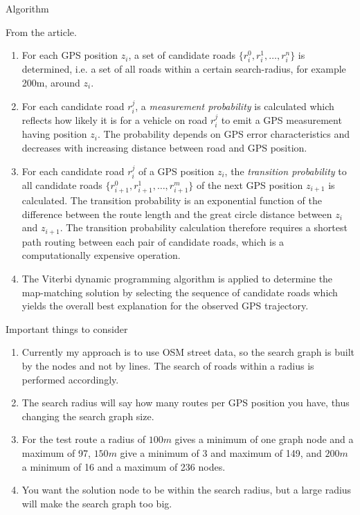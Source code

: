 \documentclass[10pt,letterpaper]{article}
\begin{document}
\begin{section}{Algorithm}

From the article.

\begin{enumerate}
	\item For each GPS position $z_i$, a set of candidate roads $\{r_i^0, r_i^1, \dots, r_i^n\}$ is determined, i.e. a set of all roads within a certain search-radius, for example 200m, around $z_i$.

	\item For each candidate road $r_i^j$, a \emph{measurement probability} is calculated which reflects how likely it is for a vehicle on road $r_i^j$ to emit a GPS measurement having position $z_i$. The probability depends on GPS error characteristics and decreases with increasing distance between road and GPS position.

	\item For each candidate road $r_i^j$ of a GPS position $z_i$, the \emph{transition probability} to all candidate roads $\{r_{i+1}^0, r_{i+1}^1, \dots, r_{i+1}^m\}$ of the next GPS position $z_{i+1}$ is calculated. The transition probability is an exponential function of the difference between the route length and the great circle distance between $z_i$ and $z_{i+1}$. The transition probability calculation therefore requires a shortest path routing between each pair of candidate roads, which is a computationally expensive operation.

	\item The Viterbi dynamic programming algorithm is applied to determine the map-matching solution by selecting the sequence of candidate roads which yields the overall best explanation for the observed GPS trajectory.
\end{enumerate}

\end{section}

\begin{section}{Important things to consider}
\begin{enumerate}
	\item Currently my approach is to use OSM street data, so the search graph is built by the nodes and not by lines. The search of roads within a radius is performed accordingly.
	\item The search radius will say how many routes per GPS position you have, thus changing the search graph size.
	\item For the test route a radius of $100m$ gives a minimum of one graph node and a maximum of 97, $150m$ give a minimum of 3 and maximum of 149, and $200m$ a minimum of 16 and a maximum of 236 nodes.
	\item You want the solution node to be within the search radius, but a large radius will make the search graph too big.
\end{enumerate}
\end{section}
\end{document}
